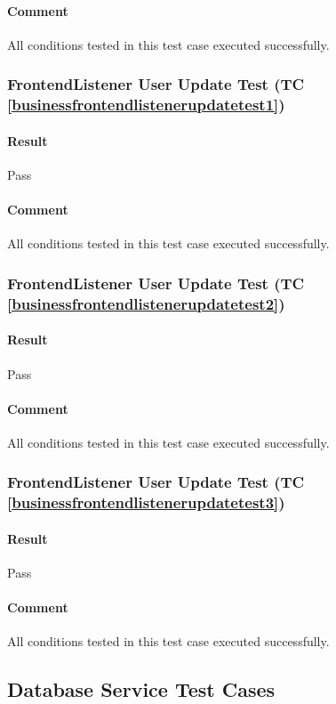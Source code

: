 \documentclass[hidelinks,english]{article}
\begin{document}
				\paragraph{Comment} All conditions tested in this test case executed successfully.
				
			\subsubsection{FrontendListener User Update Test (TC \ref{businessfrontendlistenerupdatetest1})}
				\paragraph{Result} Pass
				\paragraph{Comment} All conditions tested in this test case executed successfully.
				
			\subsubsection{FrontendListener User Update Test (TC \ref{businessfrontendlistenerupdatetest2})}
				\paragraph{Result} Pass
				\paragraph{Comment} All conditions tested in this test case executed successfully.
				
			\subsubsection{FrontendListener User Update Test (TC \ref{businessfrontendlistenerupdatetest3})}
				\paragraph{Result} Pass
				\paragraph{Comment} All conditions tested in this test case executed successfully.
				
		
		\subsection{Database Service Test Cases}
\end{document}
